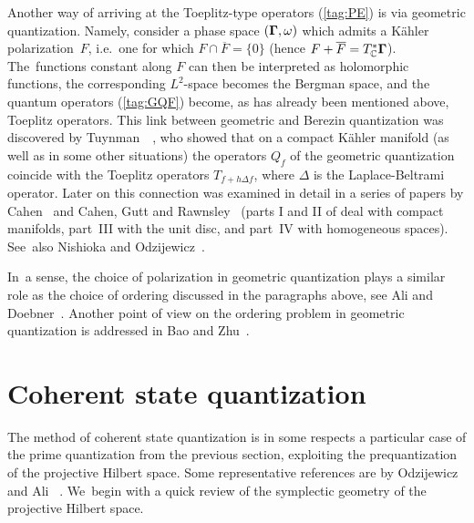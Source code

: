 \documentclass[12pt]{amsart}
\numberwithin{equation}{section}
\theoremstyle{remark}
\newcommand\Omg{{\bigam}}   %
\newcommand{\CC}{\C}
\newcommand{\bigam}{\mbox{\boldmath $\Gamma$}}
\newcommand{\C}{\mathbb C}
\begin{document}
Another way of arriving at the Toeplitz-type operators (\ref{tag:PE}) is via
geometric quantization. Namely, consider a phase space $(\Omg,\omega)$ which
admits a K\"ahler polarization~$F$, i.e.~one for which $F\cap\overline F=\{0\}$
(hence $F+\overline F=T^*_\CC \Omg$). The~functions constant along $F$ can then
be interpreted as holomorphic functions, the corresponding $L^2$-space becomes
the Bergman space, and the quantum operators (\ref{tag:GQF}) become, as has
already been mentioned above, Toeplitz operators. This link between geometric
and Berezin quantization was discovered by
Tuynman~\cite{bib:TuyGBK}~\cite{bib:TuyCm}, who showed that on a compact
K\"ahler manifold (as well as in some other situations) the operators $Q_f$ of
the geometric quantization coincide with the Toeplitz operators $T_{f+h\Delta
f}$, where $\Delta$ is the Laplace-Beltrami operator. Later on this connection
was examined in detail in a series of papers by Cahen~\cite{bib:Cahen} and
Cahen, Gutt and Rawnsley~\cite{bib:CGR} (parts I and II of \cite{bib:CGR} deal
with compact manifolds, part~III with the unit disc, and part~IV with
homogeneous spaces). See~also Nishioka \cite{bib:Nishi} and
Odzijewicz~\cite{bib:OdziB}.

In~a sense, the choice of polarization in geometric quantization plays a
similar role as the choice of ordering discussed in the paragraphs above, see
Ali and Doebner~\cite{bib:AliD}. Another point of view on the ordering problem
in geometric quantization is addressed in Bao and Zhu~\cite{bib:BaoZ}.


\section{Coherent state quantization}
\label{sec-cohstqua}
The method of coherent state quantization is in some respects a particular
case of the prime quantization from the previous section, exploiting the
prequantization of the projective Hilbert space. Some representative references
are by Odzijewicz~\cite{bib:OdzijA} \cite{bib:OdziB} \cite{bib:OdzijS}
\cite{bib:OdzijD} and Ali~\cite{bib:AliCS} \cite{bib:AAli} \cite{bib:AliM}.
We~begin with a quick review of the symplectic geometry of the projective
Hilbert space.
\end{document}
